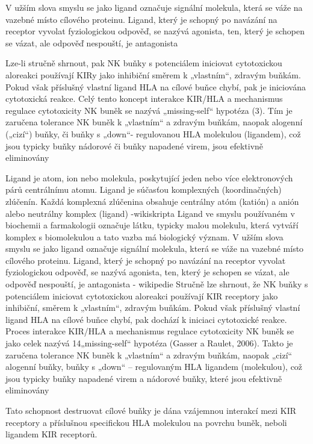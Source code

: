 \documentclass[czech,DP]{thesiskiv}
\begin{document}
V užším slova smyslu se jako ligand označuje signální molekula, která se váže na vazebné místo cílového proteinu. Ligand, který je schopný po navázání na receptor vyvolat fyziologickou odpověď, se nazývá agonista, ten, který je schopen se vázat, ale odpověď nespouští, je antagonista

Lze-li stručně shrnout, pak NK buňky s potenciálem iniciovat
cytotoxickou aloreakci používají KIRy jako inhibiční směrem k
„vlastním“, zdravým buňkám. Pokud však příslušný vlastní ligand
HLA na cílové buňce chybí, pak je iniciována cytotoxická reakce.
Celý tento koncept interakce KIR/HLA
a mechanismus regulace
cytotoxicity NK buněk se nazývá „missing-self“ hypotéza (3). Tím je
zaručena tolerance NK buněk k „vlastním“ a zdravým buňkám,
naopak alogenní („cizí“) buňky, či buňky s „down“- regulovanou HLA
molekulou (ligandem), což jsou typicky buňky nádorové či buňky
napadené virem, jsou efektivně eliminovány

Ligand je atom, ion nebo molekula, poskytující jeden nebo více elektronových párů centrálnímu atomu. Ligand je súčasťou komplexných (koordinačných) zlúčenín. Každá komplexná zlúčenina obsahuje centrálny atóm (katión) a anión alebo neutrálny komplex (ligand)
-wikiskripta
Ligand ve smyslu používaném v biochemii a farmakologii označuje látku, typicky malou molekulu, která vytváří komplex s biomolekulou a tato vazba má biologický význam. V užším slova smyslu se jako ligand označuje signální molekula, která se váže na vazebné místo cílového proteinu. Ligand, který je schopný po navázání na receptor vyvolat fyziologickou odpověď, se nazývá agonista, ten, který je schopen se vázat, ale odpověď nespouští, je antagonista
- wikipedie
Stručně lze shrnout, že NK buňky s potenciálem iniciovat cytotoxickou aloreakci používají
KIR receptory jako inhibiční, směrem k „vlastním“, zdravým buňkám. Pokud však příslušný
vlastní ligand HLA na cílové buňce chybí, pak dochází k iniciaci cytotoxické reakce. Proces
interakce KIR/HLA a mechanismus regulace cytotoxicity NK buněk se jako celek nazývá
14„missing-self“ hypotéza (Gasser a Raulet, 2006). Takto je zaručena tolerance NK buněk k
„vlastním“ a zdravým buňkám, naopak „cizí“ alogenní buňky, buňky s „down“ –
regulovaným
HLA ligandem (molekulou), což jsou typicky buňky napadené virem a
nádorové buňky, které jsou efektivně eliminovány

 Tato schopnost destruovat cílové buňky je dána
vzájemnou interakcí mezi KIR receptory a příslušnou specifickou
HLA molekulou na povrchu buněk, neboli ligandem KIR receptorů.
\end{document}
